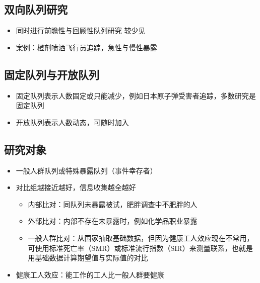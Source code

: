 \documentclass[]{book}
\providecommand{\tightlist}{%
  \setlength{\itemsep}{0pt}\setlength{\parskip}{0pt}}
\begin{document}
\hypertarget{ux53ccux5411ux961fux5217ux7814ux7a76}{%
\subsection{双向队列研究}\label{ux53ccux5411ux961fux5217ux7814ux7a76}}

\begin{itemize}
\tightlist
\item
  同时进行前瞻性与回顾性队列研究 较少见
\item
  案例：橙剂喷洒飞行员追踪，急性与慢性暴露
\end{itemize}

\hypertarget{ux56faux5b9aux961fux5217ux4e0eux5f00ux653eux961fux5217}{%
\subsection{固定队列与开放队列}\label{ux56faux5b9aux961fux5217ux4e0eux5f00ux653eux961fux5217}}

\begin{itemize}
\tightlist
\item
  固定队列表示人数固定或只能减少，例如日本原子弹受害者追踪，多数研究是固定队列
\item
  开放队列表示人数动态，可随时加入
\end{itemize}

\hypertarget{ux7814ux7a76ux5bf9ux8c61-1}{%
\subsection{研究对象}\label{ux7814ux7a76ux5bf9ux8c61-1}}

\begin{itemize}
\tightlist
\item
  一般人群队列或特殊暴露队列（事件幸存者）
\item
  对比组越接近越好，信息收集越全越好

  \begin{itemize}
  \tightlist
  \item
    内部比对：同队列未暴露被试，肥胖调查中不肥胖的人
  \item
    外部比对：内部不存在未暴露时，例如化学品职业暴露
  \item
    一般人群比对：从国家抽取基础数据，但因为健康工人效应现在不常用，可使用标准死亡率（SMR）或标准流行指数（SIR）来测量联系，也就是用基础数据计算期望值与实际值的对比
  \end{itemize}
\item
  健康工人效应：能工作的工人比一般人群要健康
\end{itemize}
\end{document}
